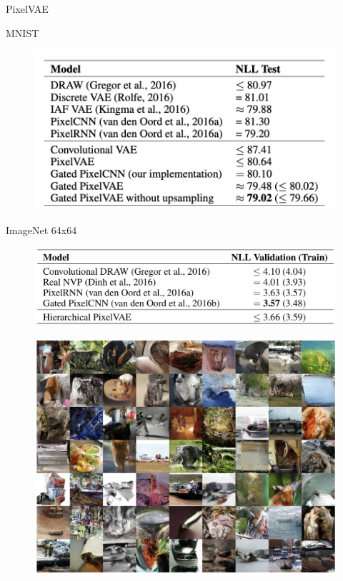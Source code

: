 \begin{frame}{PixelVAE}
	\begin{minipage}[t]{0.5\columnwidth}
		MNIST
		\begin{figure}
			\centering
			\includegraphics[width=0.9\linewidth]{figs/PixelVAE_5.png}
		\end{figure}
	\end{minipage}%
	\begin{minipage}[t]{0.5\columnwidth}
		ImageNet 64x64
		\begin{figure}
			\centering
			\includegraphics[width=\linewidth]{figs/PixelVAE_4.png}
		\end{figure}
	\end{minipage}
	\begin{figure}
	    \centering
	    \includegraphics[width=0.5\linewidth]{figs/PixelVAE_3.png}
	\end{figure}
	
\end{frame}
